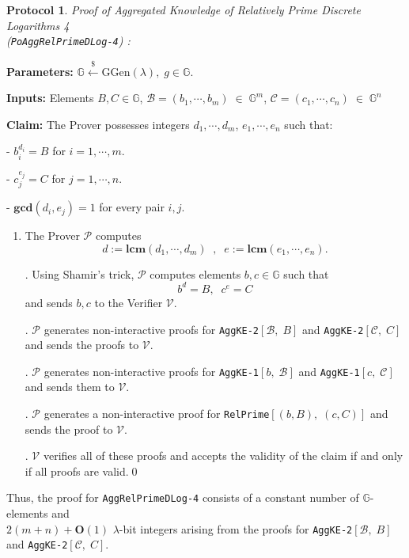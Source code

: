 \documentclass[11pt, lettersize, notitlepage, leqno, footskip=0.6cm]{article}
\newcommand{\mc}{\mathcal}
\newcommand{\mb}{\mathbb}
\newcommand{\mbf}{\mathbf}
\newcommand{\mr}{\mathrm}
\newcommand{\lam}{\lambda}
\newcommand{\lamb}{\lambda}
\newcommand{\bO}{\mbf{O}}
\newcommand{\mP}{\mc{P}}
\newcommand{\vs}{\vspace{-0.15cm}}
\newcommand{\LCM}{\mbf{lcm}}
\newcommand{\GCD}{\mbf{gcd}}
\newtheorem{Prot}[Thm]{Protocol}
\numberwithin{equation}{section}
\begin{document}
\begin{Prot} \normalfont \textit{Proof of Aggregated Knowledge of Relatively Prime Discrete Logarithms} 4\\ (\verb|PoAggRelPrimeDLog-4|) :\end{Prot}\vspace{-0.3cm}

\noindent \textbf{Parameters:} $\mb{G}\xleftarrow{\$} \mr{GGen}(\lamb), \; g\in \mb{G}$.

\noindent \textbf{Inputs:} Elements $B, C\in \mb{G}$,\;  $\mc{B} = (b_1,\cdots, b_m)\;\in\;\mb{G}^m$,\;\; $\mc{C} = (c_1,\cdots, c_n)\;\in\;\mb{G}^n$

\noindent \textbf{Claim:} The Prover possesses integers $ d_1,\cdots, d_m$,\; $e_1,\cdots,e_n$ such that:

\noindent - $b_i^{d_i} = B$ for $i = 1,\cdots, m$.

\noindent - $c_j^{e_j} = C$ for $j = 1,\cdots, n$.

\noindent - $\GCD(d_i, e_j) = 1$ for every pair $i, j$.

\begin{enumerate}[wide, labelwidth=!, labelindent=0pt]\vs \item The Prover $\mc{P}$ computes \vs $${d}:= \LCM(d_1,\cdots,d_m)\;\;,\;\; {e}:= \LCM(e_1,\cdots,e_n).$$

. Using Shamir's trick, $\mP$ computes elements $b, c \in \mb{G}$ such that \vspace{-0.15cm}$$b^{d} = B,\;\; c^{e} = C$$ and sends $b,c$ to the Verifier $\mc{V}$.

. $\mc{P}$ generates non-interactive proofs for \verb|AggKE-2|$[\mc{B},\; B]$ and \verb|AggKE-2|$[\mc{C},\; C]$ and sends the proofs to $\mc{V}$.

. $\mc{P}$ generates non-interactive proofs for \verb|AggKE-1|$[b,\;\mc{B}]$ and \verb|AggKE-1|$[c,\; \mc{C}]$ and sends them to $\mc{V}$.

. $\mc{P}$ generates a non-interactive proof for \verb|RelPrime|$[(b,B),\;(c,C)]$ and sends the proof to $\mc{V}$.

. $\mc{V}$ verifies all of these proofs and accepts the validity of the claim if and only if all proofs are valid.\qed \end{enumerate}

\noindent Thus, the proof for \verb|AggRelPrimeDLog-4| consists of a constant number of $\mb{G}$-elements and \\$2(m+n)+\bO(1)$ $\lam$-bit integers arising from the proofs for \verb|AggKE-2|$[\mc{B},\; B]$ and \verb|AggKE-2|$[\mc{C},\; C]$.
\end{document}
